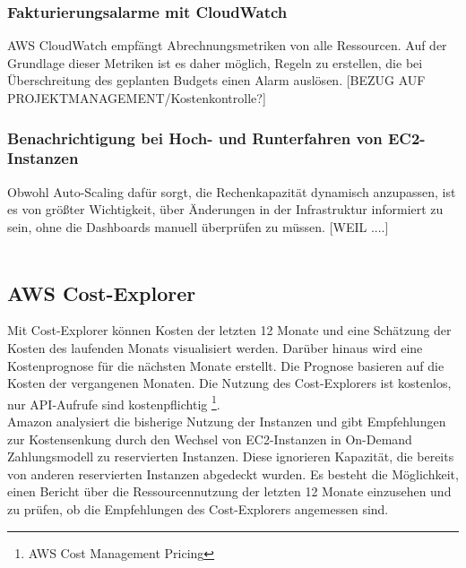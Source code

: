 \subsubsection*{Fakturierungsalarme mit CloudWatch}
AWS CloudWatch empfängt Abrechnungsmetriken von alle Ressourcen. Auf der Grundlage dieser Metriken ist es daher möglich, Regeln zu erstellen, die bei Überschreitung des geplanten Budgets einen Alarm auslösen.
[BEZUG AUF PROJEKTMANAGEMENT/Kostenkontrolle?]

\subsubsection*{Benachrichtigung bei Hoch- und Runterfahren von EC2-Instanzen}
Obwohl Auto-Scaling dafür sorgt, die Rechenkapazität dynamisch anzupassen, ist es von größter Wichtigkeit, über Änderungen in der Infrastruktur informiert zu sein, ohne die Dashboards manuell überprüfen zu müssen.
[WEIL ....]
\\\\
\subsection{AWS Cost-Explorer}\label{ssec:Cost-Explorer}
Mit Cost-Explorer können Kosten der letzten 12 Monate und eine Schätzung der Kosten des laufenden Monats visualisiert werden. Darüber hinaus wird eine Kostenprognose für die nächsten Monate erstellt. Die Prognose basieren auf die Kosten der vergangenen Monaten. Die Nutzung des Cost-Explorers ist kostenlos, nur API-Aufrufe sind kostenpflichtig \footnote{{\cite{AMZ22}AWS Cost Management Pricing}}.
\\
Amazon analysiert die bisherige Nutzung der Instanzen und gibt Empfehlungen zur Kostensenkung durch den Wechsel von EC2-Instanzen in On-Demand Zahlungsmodell zu reservierten Instanzen. Diese ignorieren Kapazität, die bereits von anderen reservierten Instanzen abgedeckt wurden.
Es besteht die Möglichkeit, einen Bericht über die Ressourcennutzung der letzten 12 Monate einzusehen und zu prüfen, ob die Empfehlungen des Cost-Explorers angemessen sind.

